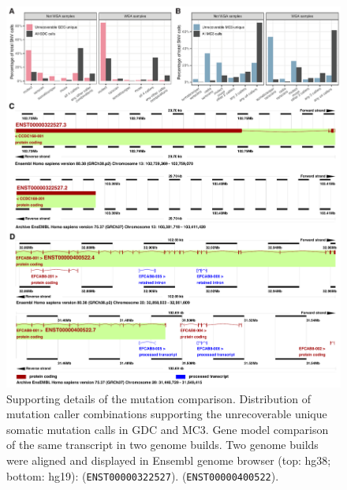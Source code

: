 \begin{figure}[tbp]
    \centering
    \includegraphics[width=\linewidth]{figures/chap02_mutation_pipeline_qc/supp_figure_combined.pdf}
    \caption[Supporting details of the mutation comparison.]{%
        Supporting details of the mutation comparison.
        Distribution of mutation caller combinations supporting the unrecoverable unique somatic  mutation calls in  GDC and  MC3.
        Gene model comparison of the same transcript in two genome builds. Two genome builds were aligned and displayed in Ensembl genome browser (top: hg38; bottom: hg19):
          (\texttt{ENST00000322527}).
          (\texttt{ENST00000400522}).
    }
    \label{fig:mut-call-qc-supp}
\end{figure}

